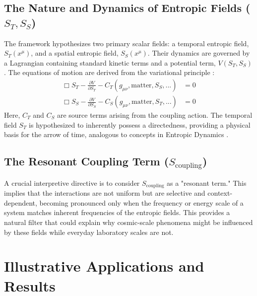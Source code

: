 \documentclass[11pt,a4paper]{article}
\newcommand{\ST}{S_T}
\newcommand{\SSp}{S_S}
\newcommand{\Scoupling}{S_{\text{coupling}}}
\begin{document}
\subsection{The Nature and Dynamics of Entropic Fields ($\ST, \SSp$)}
The framework hypothesizes two primary scalar fields: a temporal entropic field, $\ST(x^\mu)$, and a spatial entropic field, $\SSp(x^\mu)$. Their dynamics are governed by a Lagrangian containing standard kinetic terms and a potential term, $V(\ST, \SSp)$. The equations of motion are derived from the variational principle \cite{Hilbert1916}:
\begin{align}
    \Box\ST - \frac{\partial V}{\partial \ST} - C_T(g_{\mu\nu}, \text{matter}, \SSp, ...) &= 0 \label{eq:ST_eom} \\
    \Box\SSp - \frac{\partial V}{\partial \SSp} - C_S(g_{\mu\nu}, \text{matter}, \ST, ...) &= 0 \label{eq:SS_eom}
\end{align}
Here, $C_T$ and $C_S$ are source terms arising from the coupling action. The temporal field $\ST$ is hypothesized to inherently possess a directedness, providing a physical basis for the arrow of time, analogous to concepts in Entropic Dynamics \cite{caticha2015}.

\subsection{The Resonant Coupling Term ($\Scoupling$)}
A crucial interpretive directive is to consider $\Scoupling$ as a "resonant term." This implies that the interactions are not uniform but are selective and context-dependent, becoming pronounced only when the frequency or energy scale of a system matches inherent frequencies of the entropic fields. This provides a natural filter that could explain why cosmic-scale phenomena might be influenced by these fields while everyday laboratory scales are not.

\section{Illustrative Applications and Results}
\end{document}
